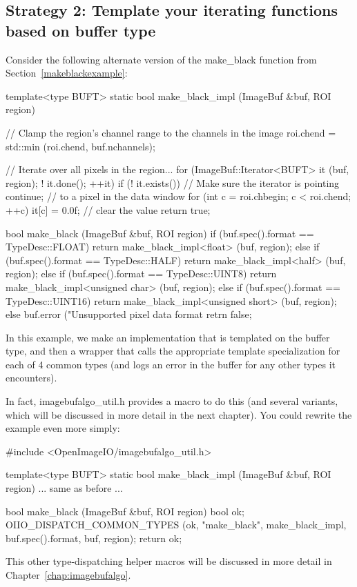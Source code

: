 \subsection*{Strategy 2: Template your iterating functions based on
buffer type}

Consider the following alternate version of the {\cf make_black} function
from Section~\ref{makeblackexample}:

\begin{code}
template<type BUFT>
static bool make_black_impl (ImageBuf &buf, ROI region)
{
    // Clamp the region's channel range to the channels in the image
    roi.chend = std::min (roi.chend, buf.nchannels);

    // Iterate over all pixels in the region...
    for (ImageBuf::Iterator<BUFT> it (buf, region);  ! it.done();  ++it) {
        if (! it.exists())   // Make sure the iterator is pointing
            continue;        //   to a pixel in the data window
        for (int c = roi.chbegin;  c < roi.chend;  ++c)
            it[c] = 0.0f;  // clear the value
    }
    return true;
}

bool make_black (ImageBuf &buf, ROI region)
{
    if (buf.spec().format == TypeDesc::FLOAT)
        return make_black_impl<float> (buf, region);
    else if (buf.spec().format == TypeDesc::HALF)
        return make_black_impl<half> (buf, region);
    else if (buf.spec().format == TypeDesc::UINT8)
        return make_black_impl<unsigned char> (buf, region);
    else if (buf.spec().format == TypeDesc::UINT16)
        return make_black_impl<unsigned short> (buf, region);
    else {
        buf.error ("Unsupported pixel data format %
        retrn false;
    }
}
\end{code}

In this example, we make an implementation that is templated on
the buffer type, and then a wrapper that calls the appropriate
template specialization for each of 4 common types (and logs
an error in the buffer for any other types it encounters).

In fact, {\cf imagebufalgo_util.h} provides a macro to do this (and
several variants, which will be discussed in more detail in the next
chapter).  You could rewrite the example even more simply:

\begin{code}
#include <OpenImageIO/imagebufalgo_util.h>

template<type BUFT>
static bool make_black_impl (ImageBuf &buf, ROI region)
{
    ... same as before ...
}

bool make_black (ImageBuf &buf, ROI region)
{
    bool ok;
    OIIO_DISPATCH_COMMON_TYPES (ok, "make_black", make_black_impl,
                                 buf.spec().format, buf, region);
    return ok;
}
\end{code}

\noindent This other type-dispatching helper macros will be discussed in more
detail in Chapter~\ref{chap:imagebufalgo}.


\chapwidthend
